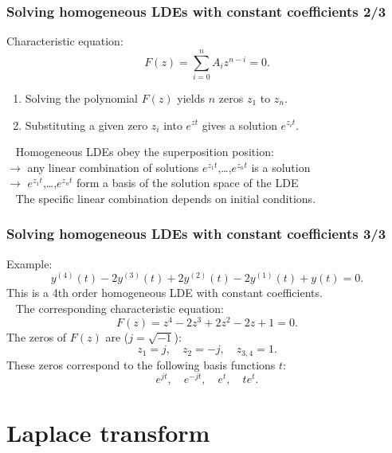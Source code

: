 \documentclass{beamer}
\begin{document}
\begin{frame}
\frametitle{Solving homogeneous LDEs with constant coefficients 2/3}
Characteristic equation:
\begin{equation*}
F(z) = \sum_{i=0}^n A_i z^{n-i} = 0.
\end{equation*}
\pause
\begin{enumerate}
\item Solving the polynomial $F(z)$ yields $n$ zeros $z_1$ to $z_n$.
\item Substituting a given zero $z_i$ into $e^{zt}$ gives a solution $e^{z_it}$.
\end{enumerate}
\ \newline
\pause
Homogeneous LDEs obey the superposition position: \\
$\rightarrow$ any linear combination of solutions $e^{z_1t}$,\ldots,$e^{z_nt}$ is a solution \pause \\
$\rightarrow$ $e^{z_1t}$,\ldots,$e^{z_nt}$ form a basis of the solution space of the LDE \\
\pause 
\ \newline
The specific linear combination depends on initial conditions.
\end{frame}


\begin{frame}
\frametitle{Solving homogeneous LDEs with constant coefficients 3/3}
Example:
\begin{equation*}
y^{(4)}(t) - 2 y^{(3)}(t) + 2 y^{(2)}(t) - 2 y^{(1)}(t) + y(t) = 0.
\end{equation*}
\pause
This is a 4th order homogeneous LDE with constant coefficients.\\
\ \newline
\pause
The corresponding characteristic equation:
\begin{equation*}
F(z) = z^4 - 2z^3 + 2z^2 - 2 z + 1 = 0.
\end{equation*}
\pause
The zeros of $F(z)$ are ($j=\sqrt{-1}$):
\begin{equation*}
z_1 = j, \quad z_2 = -j, \quad z_{3, 4} = 1.
\end{equation*}
\pause
These zeros correspond to the following basis functions $t$:
\begin{equation*}
 e^{jt}, \quad e^{-jt}, \quad e^t, \quad te^t.
\end{equation*}
\end{frame}

\section{Laplace transform}
\end{document}
